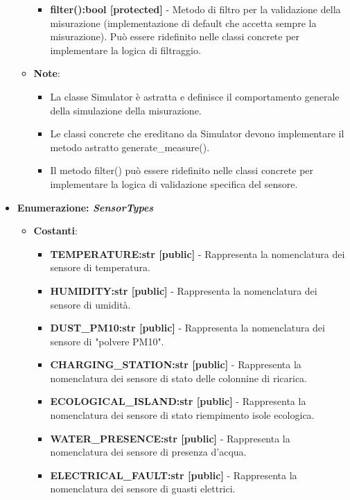 \begin{itemize}
\begin{itemize}
\begin{itemize}
                \item \textbf{filter():bool [protected]} - Metodo di filtro per la validazione della misurazione (implementazione di default che accetta sempre la misurazione). Può essere ridefinito nelle classi concrete per implementare la logica di filtraggio.
            \end{itemize}
            \item \textbf{Note}:
            \begin{itemize}
                \item La classe Simulator è astratta e definisce il comportamento generale della simulazione della misurazione.
                \item Le classi concrete che ereditano da Simulator devono implementare il metodo astratto generate\_measure().
                \item Il metodo filter() può essere ridefinito nelle classi concrete per implementare la logica di validazione specifica del sensore.
            \end{itemize}
        \end{itemize}
        
        
        
        
        \item{\textbf{Enumerazione: \textit{SensorTypes}}}
        \begin{itemize}
            \item \textbf{Costanti}: 
            \begin{itemize}
                \item \textbf{TEMPERATURE:str [public]} - Rappresenta la nomenclatura dei sensore di temperatura.
                \item \textbf{HUMIDITY:str [public]} - Rappresenta la nomenclatura dei sensore di umidità.
                \item \textbf{DUST\_PM10:str [public]} - Rappresenta la nomenclatura dei sensore di "polvere PM10".
                \item \textbf{CHARGING\_STATION:str [public]} - Rappresenta la nomenclatura dei sensore di stato delle colonnine di ricarica.
                \item \textbf{ECOLOGICAL\_ISLAND:str [public]} - Rappresenta la nomenclatura dei sensore di stato riempimento isole ecologica.
                \item \textbf{WATER\_PRESENCE:str [public]} - Rappresenta la nomenclatura dei sensore di presenza d'acqua.
                \item \textbf{ELECTRICAL\_FAULT:str [public]} - Rappresenta la nomenclatura dei sensore di guasti elettrici.
            \end{itemize}


\end{itemize}
\end{itemize}
